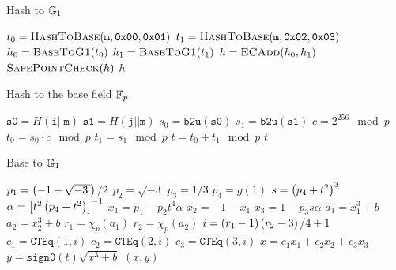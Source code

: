 \begin{algorithm}[tp]
\caption{Hash to $\mathbb{G}_{1}$}
\label{alg:hash-to-G1}
\begin{algorithmic}[1]
    \State $t_{0} = \textsc{HashToBase}(\texttt{m},\texttt{0x00},\texttt{0x01})$
    \State $t_{1} = \textsc{HashToBase}(\texttt{m},\texttt{0x02},\texttt{0x03})$
    \State $h_{0} = \textsc{BaseToG1}(t_{0})$
    \State $h_{1} = \textsc{BaseToG1}(t_{1})$
    \State $h = \textsc{ECAdd}(h_{0},h_{1})$
    \State $\textsc{SafePointCheck}(h)$
        \label{alg_line:safe_point_check}
    \State \Return $h$
\EndFunction
\end{algorithmic}
\end{algorithm}

\begin{algorithm}[tp]
\caption{Hash to the base field $\mathbb{F}_{p}$}
\label{alg:hash-to-fp}
\begin{algorithmic}[1]
    \State $\texttt{s0} = H(\texttt{i}||\texttt{m})$
    \State $\texttt{s1} = H(\texttt{j}||\texttt{m})$
    \State $s_{0} = \texttt{b2u}(\texttt{s0})$
    \State $s_{1} = \texttt{b2u}(\texttt{s1})$
    \State $c = 2^{256} \mod p$
    \State $t_{0} = s_{0}\cdot c \mod p$
    \State $t_{1} = s_{1} \mod p$
    \State $t = t_{0} + t_{1} \mod p$
    \State \Return $t$
\EndFunction
\end{algorithmic}
\end{algorithm}

\begin{algorithm}[tp]
\caption{Base to $\mathbb{G}_{1}$}
\label{alg:base-to-G1}
\begin{algorithmic}[1]
    \State $p_{1} = \parens{-1+\sqrt{-3}}/2$
    \State $p_{2} = \sqrt{-3}$
    \State $p_{3} = 1/3$
    \State $p_{4} = g(1)$
    \State $s = \left( p_{4}+ t^{2} \right)^{3}$
    \State $\alpha = \left[ t^{2}\left( p_{4} + t^{2} \right) \right]^{-1}$
        \label{alg_line:alpha_def}
    \State $x_{1} = p_{1} - p_{2}t^{4}\alpha$
    \State $x_{2} = -1 - x_{1}$
    \State $x_{3} = 1 - p_{3}s\alpha$
    \State $a_{1} = x_{1}^{3} + b$
    \State $a_{2} = x_{2}^{3} + b$
    \State $r_{1} = \chi_{p}(a_{1})$
    \State $r_{2}  = \chi_{p}(a_{2})$
    \State $i = \left( r_{1}-1 \right)\left( r_{2}-3 \right)/4 + 1$
        \label{alg_line:new_coef_func}
    \State $c_{1} = \texttt{CTEq}(1,i)$
    \State $c_{2} = \texttt{CTEq}(2,i)$
    \State $c_{3} = \texttt{CTEq}(3,i)$
    \State $x = c_{1}x_{1} + c_{2}x_{2} + c_{3}x_{3}$
    \State $y = \texttt{sign0}(t)\sqrt{x^{3}+b}$
    \State \Return $(x, y)$
\EndFunction
\end{algorithmic}
\end{algorithm}
